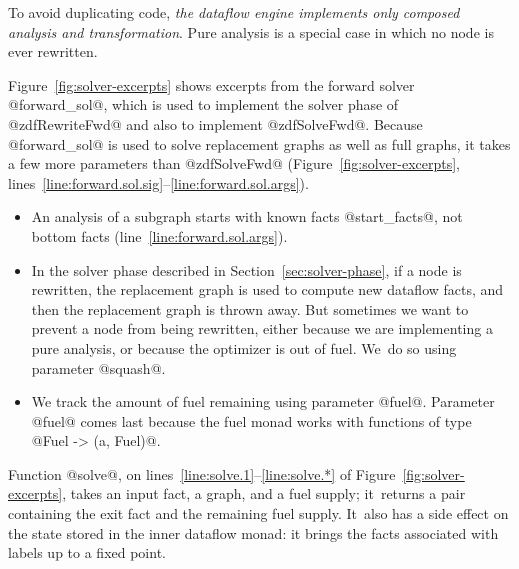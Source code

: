 \documentclass[blockstyle,preprint,nocopyrightspace]{sigplanconf}
\newcommand\lineref[1]{line~\ref{line:#1}}
\newcommand\linerangeref[2]{\mbox{lines~\ref{line:#1}--\ref{line:#2}}}
\newcommand{\authornote}[1]{{\em #1}}
\def\authornote#1{\unskip\relax}
\newcommand{\simon}[1]{\authornote{SLPJ: #1}}
\newcommand{\norman}[1]{\authornote{NR: #1}}
\let\remark\norman
\newcommand\secref[1]{Section~\ref{sec:#1}}
\newcommand\figref[1]{Figure~\ref{fig:#1}}
\begin{document}
\simon{What does the reader gain from here on?}

To avoid duplicating code,
\emph{the dataflow engine implements only composed
analysis and transformation}.
Pure analysis is a special case in which no node is
ever rewritten.


\remark{How and where do we say what's new over
\citet{ramsey-dias:applicative-flow-graph}?}


\figref{solver-excerpts} shows excerpts from the forward solver 
@forward_sol@, which is used to implement the solver phase of
@zdfRewriteFwd@ and also to implement
@zdfSolveFwd@.
Because @forward_sol@ is used to solve replacement graphs as well as
full graphs, it
takes a few more parameters than @zdfSolveFwd@
(\figref{solver-excerpts}, \linerangeref{forward.sol.sig}{forward.sol.args}).
\begin{itemize}
\item
An analysis of a subgraph starts with known facts @start_facts@, not
bottom facts (\lineref{forward.sol.args}).
\item
In the solver phase described in \secref{solver-phase},
if a node is rewritten, the replacement graph is used to compute new
dataflow facts, and then the replacement graph is thrown away.
But sometimes we want to prevent a node from being rewritten,
either because
we are implementing a pure analysis, or because the optimizer
is out of fuel. 
We~do so using parameter @squash@.
\item
We track the amount of fuel remaining using
parameter @fuel@.
Parameter @fuel@ comes last because the fuel monad works with
functions of type @Fuel -> (a, Fuel)@.
\end{itemize}
%
Function @solve@, on \linerangeref{solve.1}{solve.*} of
\figref{solver-excerpts}, 
takes an input fact, a graph, and a fuel supply; it~returns a pair
containing the exit fact and the 
remaining fuel supply.
\simon{List the operations of the monad. (Agreed ---NR)}
It~also has a side effect on the state stored in the inner dataflow monad:
it brings the facts associated with labels up to a fixed point.
 
\end{document}
